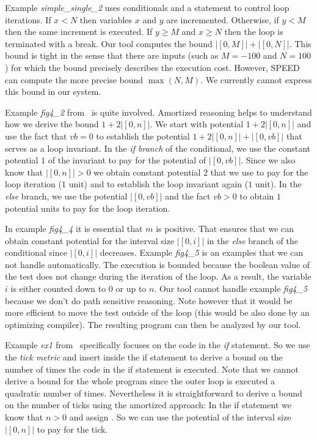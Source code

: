 \documentclass[nocopyrightspace,preprint]{sigplanconf}
\begin{document}
{Example \emph{simple\_single\_2} uses conditionals and a 
statement to control loop iterations.  If $x<N$ then variables $x$ and
$y$ are incremented.  Otherwise, if $y<M$ then the same increment is
executed.  If $y\geq M$ and $x\geq N$ then the loop is terminated with
a break.  Our tool computes the bound $|[0, M]| + |[0, N]|$.
This bound is tight in the sense that there are inputs (such as $M =
-100$ and $N = 100$) for which the bound precisely describes the
execution cost.  However, SPEED can compute the more precise bound
$\max(N,M)$.  We currently cannot express this bound in our system.

Example \emph{fig4\_2} from~\cite{GulwaniJK09} is quite involved.
Amortized reasoning helps to understand how we derive the bound $1 +
2|[0, n]|$.  We start with potential $1 + 2|[0, n]|$ and use the fact
that $vb=0$ to establish the potential $1 + 2|[0, n]| + |[0,vb]|$ that
serves as a loop invariant.  In the \emph{if branch} of the
conditional, we use the constant potential $1$ of the invariant to pay
for the potential of $|[0,vb]|$.  Since we also know that $|[0, n]|>0$
we obtain constant potential $2$ that we use to pay for the loop
iteration ($1$ unit) and to establish the loop invariant again ($1$
unit).  In the \emph{else} branch, we use the potential $|[0,vb]|$
and the fact $vb>0$ to obtain $1$ potential units to pay for the
loop iteration.

In example \emph{fig4\_4} it is essential that $m$ is positive.  That
ensures that we can obtain constant potential for the interval size
$|[0,i]|$ in the \emph{else} branch of the conditional since $|[0,i]|$
decreases.  Example \emph{fig4\_5} is an examples that we can not
handle automatically.  The execution is bounded because the boolean
value of the test  does not change during the iteration
of the loop.  As a result, the variable $i$ is either counted down to
$0$ or up to $n$.  Our tool cannot handle example \emph{fig4\_5}
because we don't do path sensitive reasoning.  Note however that it
would be more efficient to move the test  outside of
the loop (this would be also done by an optimizing compiler).  The
resulting program can then be analyzed by our tool.

Example \emph{ex1} from~\cite{GulwaniZ10} specifically focuses on the
code in the \emph{if} statement.  So we use the \emph{tick metric} and
insert  inside the if statement to derive a bound on
the number of times the code in the if statement is executed.  Note
that we cannot derive a bound for the whole program since the outer
loop is executed a quadratic number of times.  Nevertheless it is
straightforward to derive a bound on the number of ticks using the
amortized approach: In the if statement we know that $n>0$ and assign
.  So we can use the potential of the interval size $|[0,n]|$
to pay for the tick.

}
\end{document}
